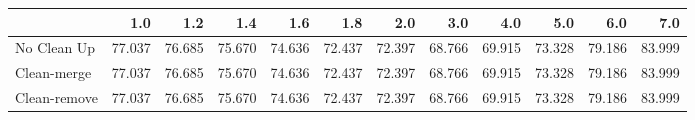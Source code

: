 \begin{tabular}{lrrrrrrrrrrr}
\toprule
{} &    1.0 &    1.2 &    1.4 &    1.6 &    1.8 &    2.0 &    3.0 &    4.0 &    5.0 &    6.0 &    7.0 \\
\midrule
No Clean Up  & 77.037 & 76.685 & 75.670 & 74.636 & 72.437 & 72.397 & 68.766 & 69.915 & 73.328 & 79.186 & 83.999 \\
Clean-merge  & 77.037 & 76.685 & 75.670 & 74.636 & 72.437 & 72.397 & 68.766 & 69.915 & 73.328 & 79.186 & 83.999 \\
Clean-remove & 77.037 & 76.685 & 75.670 & 74.636 & 72.437 & 72.397 & 68.766 & 69.915 & 73.328 & 79.186 & 83.999 \\
\bottomrule
\end{tabular}
